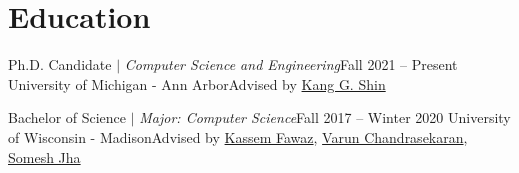 \section{Education}
  \CVSubHeadingListStart
    \CVSubheading
      {{Ph.D. Candidate $|$ \emph{\small{Computer Science and Engineering}}}}{Fall 2021 -- Present}
      {University of Michigan - Ann Arbor}{Advised by \href{https://web.eecs.umich.edu/~kgshin/}{Kang G. Shin}}

    \CVSubheading
      {{Bachelor of Science $|$ \emph{\small{Major: Computer Science}}}}{Fall 2017 -- Winter 2020}
      {University of Wisconsin - Madison}{Advised by \href{https://kassemfawaz.com/}{Kassem Fawaz}, \href{https://pages.cs.wisc.edu/~chandrasekaran/}{Varun Chandrasekaran}, \href{https://pages.cs.wisc.edu/~jha/}{Somesh Jha}}
  \CVSubHeadingListEnd